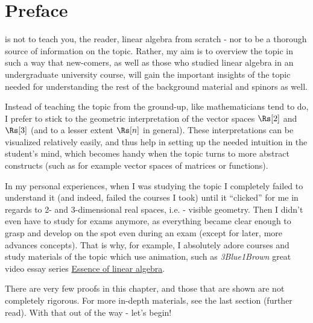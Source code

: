\section{Preface}
 is not to teach you, the reader, linear algebra from scratch - nor to be a thorough source of information on the topic. Rather, my aim is to overview the topic in such a way that new-comers, as well as those who studied linear algebra in an undergraduate university course, will gain the important insights of the topic needed for understanding the rest of the background material and spinors as well.

Instead of teaching the topic from the ground-up, like mathematicians tend to do, I prefer to stick to the geometric interpretation of the vector spaces $\Rs[2]$ and $\Rs[3]$ (and to a lesser extent $\Rs[n]$ in general). These interpretations can be visualized relatively easily, and thus help in setting up the needed intuition in the student's mind, which becomes handy when the topic turns to more abstract constructs (such as for example vector spaces of matrices or functions).

In my personal experiences, when I was studying the topic I completely failed to understand it (and indeed, failed the courses I took) until it \enquote{clicked} for me in regards to 2- and 3-dimensional real spaces, i.e. - visible geometry. Then I didn't even have to study for exams anymore, as everything became clear enough to grasp and develop on the spot even during an exam (except for later, more advances concepts). That is why, for example, I absolutely adore courses and study materials of the topic which use animation, such as \textit{3Blue1Brown} great video essay series \href{https://www.3blue1brown.com/topics/linear-algebra}{Essence of linear algebra}.

There are very few proofs in this chapter, and those that are shown are not completely rigorous. For more in-depth materials, see the last section (further read). With that out of the way - let's begin!
\newpage
